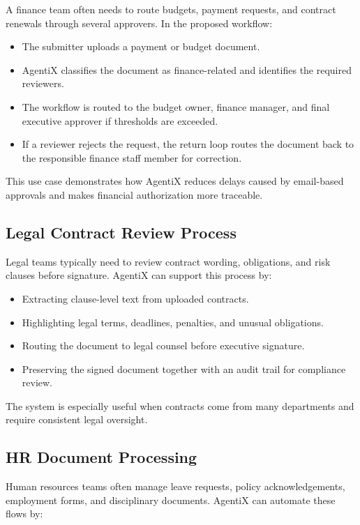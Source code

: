 \documentclass[12pt,oneside,openright,a4paper]{cpe-english-project}
\begin{document}
A finance team often needs to route budgets, payment requests, and contract renewals through several approvers. In the proposed workflow:

\begin{itemize}
  \item The submitter uploads a payment or budget document.
  \item AgentiX classifies the document as finance-related and identifies the required reviewers.
  \item The workflow is routed to the budget owner, finance manager, and final executive approver if thresholds are exceeded.
  \item If a reviewer rejects the request, the return loop routes the document back to the responsible finance staff member for correction.
\end{itemize}

This use case demonstrates how AgentiX reduces delays caused by email-based approvals and makes financial authorization more traceable.

\subsection{Legal Contract Review Process}

Legal teams typically need to review contract wording, obligations, and risk clauses before signature. AgentiX can support this process by:

\begin{itemize}
  \item Extracting clause-level text from uploaded contracts.
  \item Highlighting legal terms, deadlines, penalties, and unusual obligations.
  \item Routing the document to legal counsel before executive signature.
  \item Preserving the signed document together with an audit trail for compliance review.
\end{itemize}

The system is especially useful when contracts come from many departments and require consistent legal oversight.

\subsection{HR Document Processing}

Human resources teams often manage leave requests, policy acknowledgements, employment forms, and disciplinary documents. AgentiX can automate these flows by:
\end{document}
